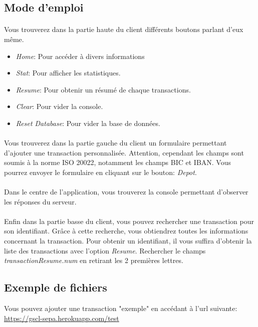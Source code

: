 \documentclass{article}
\begin{document}
    \subsection{Mode d’emploi}
      \paragraph{}
	Vous trouverez dans la partie haute du client différents boutons parlant d'eux même. 
	\begin{itemize}
	 \item \emph{Home}: Pour accéder à divers informations
	 \item \emph{Stat}: Pour afficher les statistiques.
	 \item \emph{Resume}: Pour obtenir un résumé de chaque transactions.
	 \item \emph{Clear}: Pour vider la console.
	 \item \emph{Reset Database}: Pour vider la base de données.
	\end{itemize}

      \paragraph{}
	Vous trouverez dans la partie gauche du client un formulaire permettant d'ajouter une transaction personnalisée.
	Attention, cependant les champs sont soumis à la norme ISO 20022, notamment les champs BIC et IBAN.
	Vous pourrez envoyer le formulaire en cliquant sur le bouton: \emph{Depot}.
      \paragraph{}
	Dans le centre de l'application, vous trouverez la console permettant d'observer les réponses du serveur.
      \paragraph{}
	Enfin dans la partie basse du client, vous pouvez rechercher une transaction pour son identifiant.
	Grâce à cette recherche, vous obtiendrez toutes les informations concernant la transaction.
	Pour obtenir un identifiant, il vous suffira d'obtenir la liste des transactions avec l'option \emph{Resume}.
	Rechercher le champs \emph{transactionResume.num} en retirant les 2 premières lettres.
    \subsection{Exemple de fichiers}
      Vous pouvez ajouter une transaction "exemple" en accédant à l'url suivante: \\
      \url{https://gscl-sepa.herokuapp.com/test}
      
\end{document}

